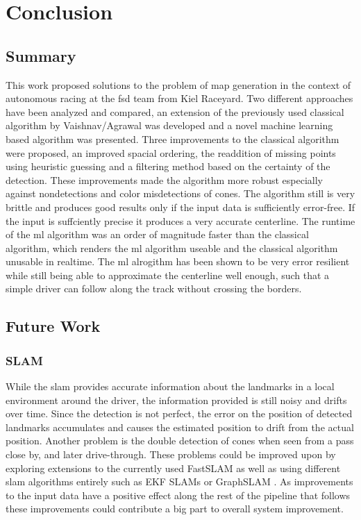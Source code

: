\chapter{Conclusion}
\label{chap:end}

\section{Summary}
This work proposed solutions to the problem of map generation in the context of autonomous racing at the \ac{fsd} team from Kiel Raceyard. Two different approaches have been analyzed and compared, an extension of the previously used classical algorithm by Vaishnav/Agrawal was developed and a novel machine learning based algorithm was presented. Three improvements to the classical algorithm were proposed, an improved spacial ordering, the readdition of missing points using heuristic guessing and a filtering method based on the certainty of the detection. These improvements made the algorithm more robust especially against nondetections and color misdetections of cones. The algorithm still is very brittle and produces good results only if the input data is sufficiently error-free. If the input is suffciently precise it produces a very accurate centerline. The runtime of the \ac{ml} algorithm was an order of magnitude faster than the classical algorithm, which renders the \ac{ml} algorithm useable and the classical algorithm unusable in realtime. The \ac{ml} alrogithm has been shown to be very error resilient while still being able to approximate the centerline well enough, such that a simple driver can follow along the track without crossing the borders.

\section{Future Work}
\subsection{SLAM}
While the \ac{slam} provides accurate information about the landmarks in a local environment around the driver, the information provided is still noisy and drifts over time. Since the detection is not perfect, the error on the position of detected landmarks accumulates and causes the estimated position to drift from the actual position. Another problem is the double detection of cones when seen from a pass close by, and later drive-through. These problems could be improved upon by exploring extensions to the currently used FastSLAM \cite{FastSLAM2002} as well as using different \ac{slam} algorithms entirely such as EKF SLAMs \cite{EKFSLAM1986} or GraphSLAM \cite{graphSLAM2006}. As improvements to the input data have a positive effect along the rest of the pipeline that follows these improvements could contribute a big part to overall system improvement.
